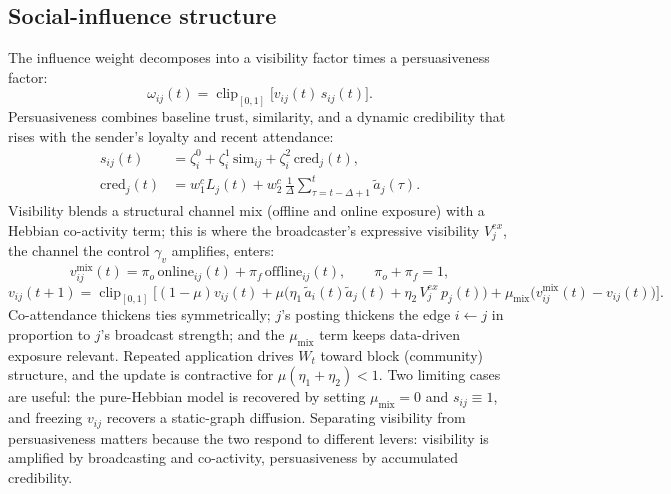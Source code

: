 \documentclass[11pt]{article}
\newcommand{\clip}{\operatorname{clip}_{[0,1]}}
\begin{document}
\subsection{Social-influence structure}\label{sec:influence}
The influence weight decomposes into a visibility factor times a persuasiveness factor:
\begin{equation}\tag{7}\label{eq:omega}
\omega_{ij}(t)=\clip\!\big[v_{ij}(t)\,s_{ij}(t)\big].
\end{equation}
Persuasiveness combines baseline trust, similarity, and a dynamic credibility that rises with the sender's loyalty and recent attendance:
\begin{align}
s_{ij}(t)&=\zeta^0_i+\zeta^1_i\,\mathrm{sim}_{ij}+\zeta^2_i\,\mathrm{cred}_j(t),\tag{9}\label{eq:persuade}\\
\mathrm{cred}_j(t)&=w^{c}_1 L_j(t)+w^{c}_2\,\tfrac1\Delta\!\!\sum_{\tau=t-\Delta+1}^{t}\!\!\tilde a_j(\tau).\tag{10}\label{eq:cred}
\end{align}
Visibility blends a structural channel mix (offline and online exposure) with a Hebbian co-activity term; this is where the broadcaster's expressive visibility $V^{ex}_j$, the channel the control $\gamma_v$ amplifies, enters:
\begin{equation}\tag{8}\label{eq:vmix}
v^{\mathrm{mix}}_{ij}(t)=\pi_o\,\mathrm{online}_{ij}(t)+\pi_f\,\mathrm{offline}_{ij}(t),\qquad \pi_o+\pi_f=1,
\end{equation}
\begin{equation}\tag{11}\label{eq:vupdate}
v_{ij}(t{+}1)=\clip\!\Big[(1-\mu)v_{ij}(t)+\mu\big(\eta_1\,\tilde a_i(t)\tilde a_j(t)+\eta_2\,V^{ex}_j\,p_j(t)\big)+\mu_{\mathrm{mix}}\big(v^{\mathrm{mix}}_{ij}(t)-v_{ij}(t)\big)\Big].
\end{equation}
Co-attendance thickens ties symmetrically; $j$'s posting thickens the edge $i\!\leftarrow\! j$ in proportion to $j$'s broadcast strength; and the $\mu_{\mathrm{mix}}$ term keeps data-driven exposure relevant. Repeated application drives $W_t$ toward block (community) structure, and the update is contractive for $\mu(\eta_1+\eta_2)<1$. Two limiting cases are useful: the pure-Hebbian model is recovered by setting $\mu_{\mathrm{mix}}=0$ and $s_{ij}\equiv1$, and freezing $v_{ij}$ recovers a static-graph diffusion. Separating visibility from persuasiveness matters because the two respond to different levers: visibility is amplified by broadcasting and co-activity, persuasiveness by accumulated credibility.
\end{document}
